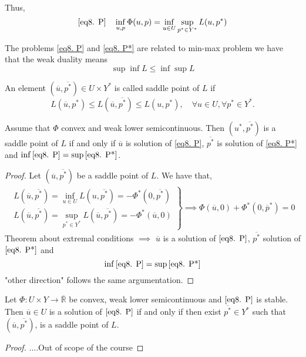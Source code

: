 Thus,
\begin{equation}
\eqref{eq8. P} \quad \inf_{u, p} \Phi(u, p) = \inf_{u \in U} \sup_{p^*\in Y^*} L(u, p^*)
\end{equation}

\begin{remark}
	The problems \eqref{eq8. P} and \eqref{eq8. P*} are related to min-max problem we have that the weak duality means 
	\[
		\sup \inf L \leq \inf \sup L
	\]
\end{remark}

\begin{definition}
	An element $(\overline{u}, \overline{p^*}) \in U\times Y^*$ is called saddle point of $L$ if 
	\[
		L(\overline{u}, p^*) \leq L(\overline{u}, \overline{p^*}) \leq L(u, p^*), \quad \forall u \in U, \forall p^* \in Y^*.
	\]
\end{definition}

\begin{theorem}
	Assume that $\Phi$ convex and weak lower semicontinuous. Then $(u^*, \overline{p^*})$ is a saddle point of $L$ if and only if $\overline{u}$ is solution of \eqref{eq8. P}, $\overline{p^*}$ is solution of \eqref{eq8. P*} and $\inf\eqref{eq8. P}=\sup\eqref{eq8. P*}$.
	\begin{proof}
		Let $(\overline{u}, \overline{p^*})$ be a saddle point of $L$. We have that, 
		\begin{align*}
		\left.
		\begin{array}{c}
		L(\overline{u}, \overline{p^*}) = \inf_{u \in U} L(u, \overline{p^*})=-\Phi^*(0, \overline{p^*}) \\
		L(\overline{u}, \overline{p^*}) = \sup_{p^* \in Y^*} L(\overline{u}, \overline{p^*})=-\Phi^*(\overline{u}, 0)
		\end{array}
		\right\rbrace \implies \Phi(\overline{u}, 0)+\Phi^*(0, \overline{p}^*)=0
		\end{align*}
		Theorem about extremal conditions $\implies$ $\overline{u}$ is a solution of $\eqref{eq8. P}$, $\overline{p^*}$ solution of $\eqref{eq8. P*}$ and 
		\[
			\inf\eqref{eq8. P} = \sup\eqref{eq8. P*}
		\]
		"other direction" follows the same argumentation.
	\end{proof}
\end{theorem}
\begin{theorem}
	Let $\Phi: U \times Y \rightarrow \overline{\mathbb{R}}$ be convex, weak lower semicontinuous and $\eqref{eq8. P}$ is stable. Then $\overline{u}\in U$ is a solution of $\eqref{eq8. P}$ if and only if then exist $\overline{p^*} \in Y^*$ such that $(\overline{u}, \overline{p^*})$, is a saddle point of $L$.
	\begin{proof}
....Out of scope of the course
	\end{proof}
\end{theorem}
